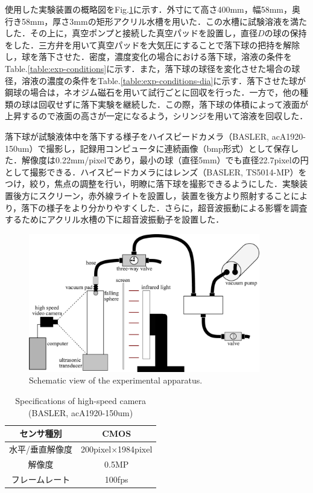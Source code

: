 使用した実験装置の概略図をFig.\ref{fig:device}に示す．外寸にて高さ400mm，幅58mm，奥行き58mm，厚さ3mmの矩形アクリル水槽を用いた．この水槽に試験溶液を満たした．その上に，真空ポンプと接続した真空パッドを設置し，直径$D$の球の保持をした．三方弁を用いて真空パッドを大気圧にすることで落下球の把持を解除し，球を落下させた．密度，濃度変化の場合における落下球，溶液の条件をTable.\ref{table:exp-conditions}に示す．また，落下球の球径を変化させた場合の球径，溶液の濃度の条件をTable.\ref{table:exp-conditions-dia}に示す．落下させた球が鋼球の場合は，ネオジム磁石を用いて試行ごとに回収を行った．一方で，他の種類の球は回収せずに落下実験を継続した．この際，落下球の体積によって液面が上昇するので液面の高さが一定になるよう，シリンジを用いて溶液を回収した．

落下球が試験液体中を落下する様子をハイスピードカメラ（BASLER, acA1920-150um）で撮影し，記録用コンピュータに連続画像（bmp形式）として保存した．解像度は0.22mm/pixelであり，最小の球（直径5mm）でも直径22.7pixelの円として撮影できる．ハイスピードカメラにはレンズ（BASLER, TS5014-MP）をつけ，絞り，焦点の調整を行い，明瞭に落下球を撮影できるようにした．実験装置後方にスクリーン，赤外線ライトを設置し，装置を後方より照射することにより，落下の様子をより分かりやすくした．さらに，超音波振動による影響を調査するためにアクリル水槽の下に超音波振動子を設置した．

\begin{figure}[h]
    \centering
    \includegraphics[width=0.9\textwidth]{2-Methods/device-vacuum.eps}
    \caption{Schematic view of the experimental apparatus.}
    \label{fig:device}
\end{figure}

\begin{table}[h]
    \centering
    \caption{Specifications of high-speed camera (BASLER, acA1920-150um)}
    \label{table:camera}
    \begin{tabular}{c|c}\hline
        センサ種別      & CMOS                      \\ \hline
        水平/垂直解像度 & 200pixel$\times$1984pixel \\ \hline
        解像度          & 0.5MP                     \\ \hline
        フレームレート  & 100fps                    \\ \hline
    \end{tabular}
\end{table}

